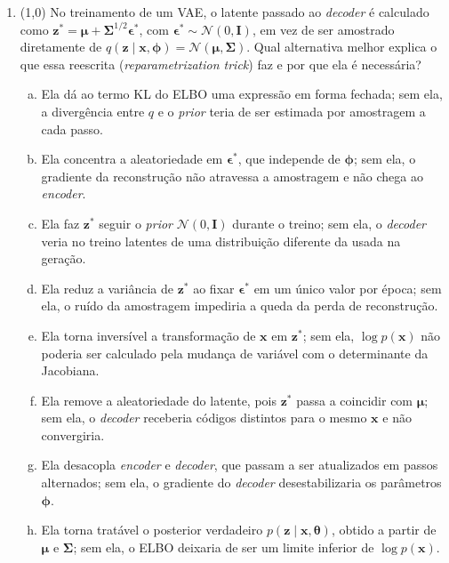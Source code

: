 \documentclass[11pt,a4paper]{article}
\newcommand{\thetav}{\boldsymbol{\theta}}
\begin{document}
\begin{enumerate}[1)]
\item (1{,}0) No treinamento de um VAE, o latente passado ao \textit{decoder} é calculado como $\mathbf{z}^{*} = \boldsymbol{\mu} + \boldsymbol{\Sigma}^{1/2}\boldsymbol{\epsilon}^{*}$, com $\boldsymbol{\epsilon}^{*} \sim \mathcal{N}(0, \mathbf{I})$, em vez de ser amostrado diretamente de $q(\mathbf{z} \mid \mathbf{x}, \boldsymbol{\phi}) = \mathcal{N}(\boldsymbol{\mu}, \boldsymbol{\Sigma})$. Qual alternativa melhor explica o que essa reescrita (\textit{reparametrization trick}) faz e por que ela é necessária?
\begin{enumerate}[a)]
    \item Ela dá ao termo KL do ELBO uma expressão em forma fechada; sem ela, a divergência entre $q$ e o \textit{prior} teria de ser estimada por amostragem a cada passo.
    \item Ela concentra a aleatoriedade em $\boldsymbol{\epsilon}^{*}$, que independe de $\boldsymbol{\phi}$; sem ela, o gradiente da reconstrução não atravessa a amostragem e não chega ao \textit{encoder}.
    \item Ela faz $\mathbf{z}^{*}$ seguir o \textit{prior} $\mathcal{N}(0, \mathbf{I})$ durante o treino; sem ela, o \textit{decoder} veria no treino latentes de uma distribuição diferente da usada na geração.
    \item Ela reduz a variância de $\mathbf{z}^{*}$ ao fixar $\boldsymbol{\epsilon}^{*}$ em um único valor por época; sem ela, o ruído da amostragem impediria a queda da perda de reconstrução.
    \item Ela torna inversível a transformação de $\mathbf{x}$ em $\mathbf{z}^{*}$; sem ela, $\log p(\mathbf{x})$ não poderia ser calculado pela mudança de variável com o determinante da Jacobiana.
    \item Ela remove a aleatoriedade do latente, pois $\mathbf{z}^{*}$ passa a coincidir com $\boldsymbol{\mu}$; sem ela, o \textit{decoder} receberia códigos distintos para o mesmo $\mathbf{x}$ e não convergiria.
    \item Ela desacopla \textit{encoder} e \textit{decoder}, que passam a ser atualizados em passos alternados; sem ela, o gradiente do \textit{decoder} desestabilizaria os parâmetros $\boldsymbol{\phi}$.
    \item Ela torna tratável o posterior verdadeiro $p(\mathbf{z} \mid \mathbf{x}, \thetav)$, obtido a partir de $\boldsymbol{\mu}$ e $\boldsymbol{\Sigma}$; sem ela, o ELBO deixaria de ser um limite inferior de $\log p(\mathbf{x})$.
\end{enumerate}


\end{enumerate}
\end{document}
